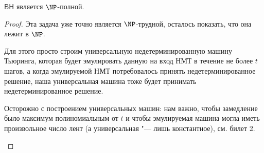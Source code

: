 	\begin{theorem}
		$\mathsf{BH}$ является $\NP$-полной.
	\end{theorem}
	\begin{proof}
		Эта задача уже точно является $\NP$-трудной, осталось показать, что она лежит в $\NP$.

		Для этого просто строим универсальную недетерминированную машину Тьюринга, которая будет эмулировать данную на вход НМТ
		в течение не более $t$ шагов, а когда эмулируемой НМТ потребовалось принять недетерминированное решение, наша универсальная машина тоже
		будет принимать недетерминированное решение.
		\begin{Rem}
			Осторожно с построением универсальных машин: нам важно, чтобы замедление было максимум полиномиальным от $t$ и чтобы эмулируемая машина
			могла иметь произвольное число лент (а универсальная "--- лишь константное), см. билет 2.
		\end{Rem}
	\end{proof}
